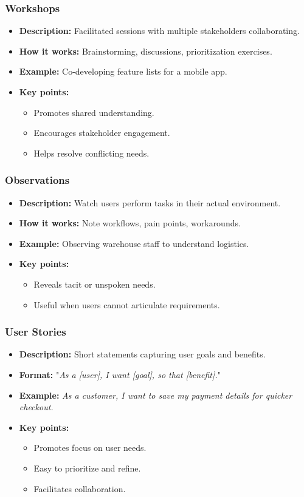\documentclass{beamer}
\begin{document}
\begin{frame}[fragile]
  \frametitle{Workshops}
  \begin{itemize}
    \item \textbf{Description:} Facilitated sessions with multiple stakeholders collaborating.
    \item \textbf{How it works:} Brainstorming, discussions, prioritization exercises.
    \item \textbf{Example:} Co-developing feature lists for a mobile app.
    \item \textbf{Key points:}
      \begin{itemize}
        \item Promotes shared understanding.
        \item Encourages stakeholder engagement.
        \item Helps resolve conflicting needs.
      \end{itemize}
  \end{itemize}
\end{frame}

\begin{frame}[fragile]
  \frametitle{Observations}
  \begin{itemize}
    \item \textbf{Description:} Watch users perform tasks in their actual environment.
    \item \textbf{How it works:} Note workflows, pain points, workarounds.
    \item \textbf{Example:} Observing warehouse staff to understand logistics.
    \item \textbf{Key points:}
      \begin{itemize}
        \item Reveals tacit or unspoken needs.
        \item Useful when users cannot articulate requirements.
      \end{itemize}
  \end{itemize}
\end{frame}

\begin{frame}[fragile]
  \frametitle{User Stories}
  \begin{itemize}
    \item \textbf{Description:} Short statements capturing user goals and benefits.
    \item \textbf{Format:} "\textit{As a [user], I want [goal], so that [benefit].}"
    \item \textbf{Example:} \textit{As a customer, I want to save my payment details for quicker checkout.}
    \item \textbf{Key points:}
      \begin{itemize}
        \item Promotes focus on user needs.
        \item Easy to prioritize and refine.
        \item Facilitates collaboration.
      \end{itemize}
  \end{itemize}
\end{frame}
\end{document}
